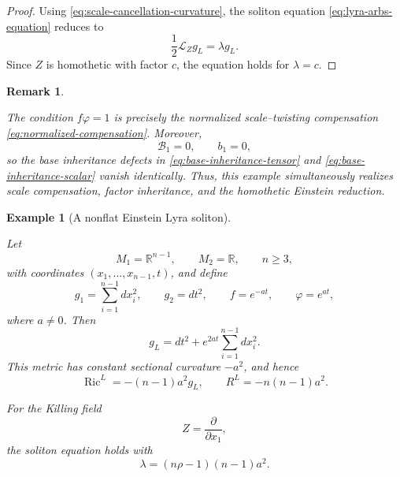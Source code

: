 \documentclass[a4paper,11pt]{article}
\theoremstyle{plain}
\newtheorem{example}{Example}[section]
\newtheorem{remark}{Remark}[section]
\numberwithin{equation}{section}
\begin{document}
\begin{proof}
	Using \eqref{eq:scale-cancellation-curvature}, the soliton
	equation \eqref{eq:lyra-arbs-equation} reduces to
	\[
	\frac12\mathcal L_{Z}g_{L}
	=
	\lambda g_{L}.
	\]
	Since \(Z\) is homothetic with factor \(c\), the equation holds
	for \(\lambda=c\).
\end{proof}

\begin{remark}
	\label{rem:scale-cancellation-significance}
	
	The condition \(f\varphi=1\) is precisely the normalized
	scale--twisting compensation
	\eqref{eq:normalized-compensation}. Moreover,
	\[
	\mathcal B_{1}=0,
	\qquad
	b_{1}=0,
	\]
	so the base inheritance defects in
	\eqref{eq:base-inheritance-tensor} and
	\eqref{eq:base-inheritance-scalar} vanish identically.
	Thus, this example simultaneously realizes scale compensation,
	factor inheritance, and the homothetic Einstein reduction.
\end{remark}

\begin{example}[A nonflat Einstein Lyra soliton]
	\label{ex:hyperbolic-lyra-soliton}
	
	Let
	\[
	M_{1}=\mathbb R^{n-1},
	\qquad
	M_{2}=\mathbb R,
	\qquad
	n\geq3,
	\]
	with coordinates
	\((x_{1},\ldots,x_{n-1},t)\), and define
	\begin{equation}
		g_{1}
		=
		\sum_{i=1}^{n-1}dx_{i}^{2},
		\qquad
		g_{2}=dt^{2},
		\qquad
		f=e^{-at},
		\qquad
		\varphi=e^{at},
		\label{eq:hyperbolic-data}
	\end{equation}
	where \(a\neq0\). Then
	\begin{equation}
		g_{L}
		=
		dt^{2}
		+
		e^{2at}
		\sum_{i=1}^{n-1}dx_{i}^{2}.
		\label{eq:hyperbolic-lyra-metric}
	\end{equation}
	This metric has constant sectional curvature \(-a^{2}\), and
	hence
	\begin{equation}
		\operatorname{Ric}^{L}
		=
		-(n-1)a^{2}g_{L},
		\qquad
		R^{L}
		=
		-n(n-1)a^{2}.
		\label{eq:hyperbolic-lyra-curvature}
	\end{equation}
	
	For the Killing field
	\[
	Z=\frac{\partial}{\partial x_{1}},
	\]
	the soliton equation holds with
	\begin{equation}
		\lambda
		=
		(n\rho-1)(n-1)a^{2}.
		\label{eq:hyperbolic-soliton-function}
	\end{equation}
\end{example}
\end{document}
